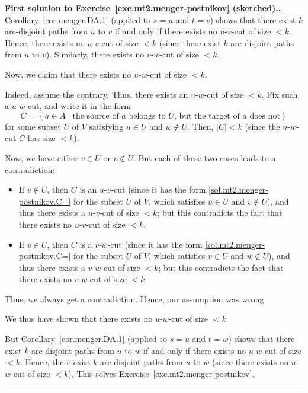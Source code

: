\documentclass[numbers=enddot,12pt,final,onecolumn,notitlepage]{scrartcl}%
\theoremstyle{definition}
\newenvironment{proof}[1][Proof]{\noindent\textbf{#1.} }{\ \rule{0.5em}{0.5em}}
\newcommand{\set}[1]{\left\{ #1 \right\}}
\newcommand{\abs}[1]{\left| #1 \right|}
\begin{document}
\begin{proof}[First solution to
Exercise~\ref{exe.mt2.menger-postnikov} (sketched).]
Corollary~\ref{cor.menger.DA.1} (applied to $s = u$ and $t = v$) shows
that there exist $k$ arc-disjoint paths from $u$ to $v$ if and only
if there exists no $u$-$v$-cut of size $< k$.
Hence, there exists no $u$-$v$-cut of size $< k$
(since there exist $k$ arc-disjoint paths from $u$ to $v$).
Similarly, there exists no $v$-$w$-cut of size $< k$.

Now, we claim that there exists no $u$-$w$-cut of size $< k$.

Indeed, assume the contrary.
Thus, there exists an $u$-$w$-cut of size $< k$.
Fix such a $u$-$w$-cut, and write it in the form
\begin{equation}
C = \set{ a \in A \mid \text{the source of } a \text{ belongs to } U
                        \text{, but the target of } a \text{ does not}
        }
\label{sol.mt2.menger-postnikov.C=}
\end{equation}
for some subset $U$ of $V$ satisfying $u \in U$ and $w \notin U$.
Then, $\abs{C} < k$ (since the $u$-$w$-cut $C$ has size $< k$).

Now, we have either $v \in U$ or $v \notin U$.
But each of these two cases leads to a contradiction:

\begin{itemize}

\item If $v \notin U$, then $C$ is an $u$-$v$-cut (since it has the
      form \eqref{sol.mt2.menger-postnikov.C=} for the subset $U$
      of $V$, which satisfies $u \in U$ and $v \notin U$), and thus
      there exists a $u$-$v$-cut of size $< k$; but this
      contradicts the fact that there exists no $u$-$v$-cut of size
      $< k$.

\item If $v \in U$, then $C$ is a $v$-$w$-cut (since it has the
      form \eqref{sol.mt2.menger-postnikov.C=} for the subset $U$
      of $V$, which satisfies $v \in U$ and $w \notin U$), and thus
      there exists a $v$-$w$-cut of size $< k$; but this
      contradicts the fact that there exists no $v$-$w$-cut of size
      $< k$.

\end{itemize}

Thus, we always get a contradiction.
Hence, our assumption was wrong.

We thus have shown that there exists no $u$-$w$-cut of size $< k$.

But Corollary~\ref{cor.menger.DA.1} (applied to $s = u$ and $t = w$)
shows that there exist $k$ arc-disjoint paths from $u$ to $w$ if and
only if there exists no $u$-$w$-cut of size $< k$.
Hence, there exist $k$ arc-disjoint paths from $u$ to $w$ (since
there exists no $u$-$w$-cut of size $< k$).
This solves Exercise~\ref{exe.mt2.menger-postnikov}.
\end{proof}
\end{document}
